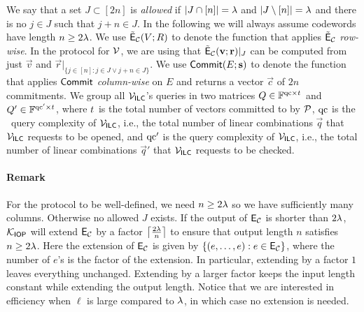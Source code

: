 We say that a set $J\subset [2n]$ is \emph{allowed} if $|J\cap [n]|=\lambda$ and $|J\setminus [n]|=\lambda$ and there is no $j\in J$ such that $j+n\in J$. In the following we will always assume codewords have length $n\geq 2\lambda$.
We use $\tilde{\mathsf{E}}_{\mathcal{C}}(V;R)$ to denote the function that applies $\tilde{\mathsf{E}}_{\mathcal{C}}$ \emph{row-wise}.
In the protocol for $\mathcal{V}$, we are using that $\tilde{\mathsf{E}}_{\mathcal{C}}(\mathbf{v};\mathbf{r})|_J$ can be computed from just $\vec{v}$ and $\vec{r}|_{\{j\in [n]:j\in J \vee j+n\in J\}}$. We use $\mathsf{Commit}(E;\mathbf{s})$ to denote the function that applies $\mathsf{Commit}$ \emph{column-wise} on $E$ and returns a vector $\vec{c}$ of $2n$ commitments. 
We group all $\mathcal{V}_{\mathsf{ILC}}$'s queries in two matrices $Q \in \mathbb{F}^{\mathrm{qc}\times {t_{}}}$ and $Q' \in \mathbb{F}^{\mathrm{qc}' \times {t_{}}}$, where ${t_{}}$ is the total number of vectors committed to by $\mathcal{P}$, $\mathrm{qc}$ is the \ILCopen\ query complexity of $\mathcal{V}_{\mathsf{ILC}}$, i.e., the total number of linear combinations $\vec{q}$ that $\mathcal{V}_{\mathsf{ILC}}$ requests to be opened, and $\mathrm{qc}'$ is the \ILCcheck query complexity of $\mathcal{V}_{\mathsf{ILC}}$, i.e., the total number of linear combinations $\vec{q}'$ that $\mathcal{V}_{\mathsf{ILC}}$ requests to be checked.

\paragraph{Remark}\label{welldef} For the protocol to be well-defined, we need $n\geq 2\lambda$ so we have sufficiently many columns. Otherwise no allowed $J$ exists. If the output of $\mathsf{E}_{\mathcal{C}}$ is shorter than $2\lambda$, $\mathcal{K}_{\mathsf{IOP}}$ will extend $\mathsf{E}_{\mathcal{C}}$ by a factor $\left\lceil \frac{2\lambda}{n}\right\rceil$ to ensure that output length $n$ satisfies $n\geq 2\lambda$. Here the extension of $\mathsf{E}_{\mathcal{C}}$ is given by $\{(e,\dots,e): e\in\mathsf{E}_{\mathcal{C}}\}$, where the number of $e$'s is the factor of the extension. In particular, extending by a factor $1$ leaves everything unchanged. Extending by a larger factor keeps the input length constant while extending the output length. Notice that we are interested in efficiency when $\ell$ is large compared to $\lambda$, in which case no extension is needed.

